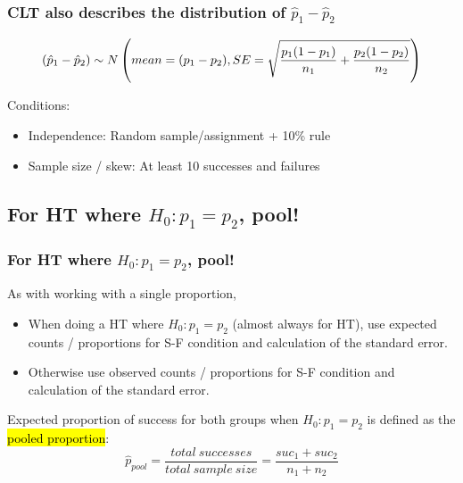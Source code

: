 \documentclass[slidestop,compress,mathserif,12pt,t,professionalfonts,xcolor=table]{beamer}
\begin{document}

\begin{frame}
\frametitle{CLT also describes the distribution of $\hat{p}_1 - \hat{p}_2$}

\[ (\hat{p}_1 - \hat{p}_2) \sim N \left(  mean = (p_1 - p_2), SE = \sqrt{ \frac{p_1(1-p_1)}{n_1} + \frac{p_2(1-p_2)}{n_2} }  \right) \]

Conditions:
\begin{itemize}
\item Independence: Random sample/assignment + 10\% rule
\item Sample size / skew: At least 10 successes and failures
\end{itemize}

\end{frame}


\subsection{For HT where $H_0: p_1 = p_2$, pool!}
\label{mi2}


\begin{frame}
\frametitle{For HT where $H_0: p_1 = p_2$, pool!}

As with working with a single proportion,

\begin{itemize}

\item When doing a HT where $H_0: p_1 = p_2$ (almost always for HT), use expected counts / proportions for S-F condition and calculation of the standard error.

\item Otherwise use observed counts / proportions for S-F condition and calculation of the standard error.

\end{itemize}

\pause 

Expected proportion of success for both groups when $H_0: p_1 = p_2$ is defined as the \hl{pooled proportion}:
\[ \hat{p}_{pool} = \frac{total~successes}{total~sample~size} = \frac{suc_1 + suc_2}{n_1 + n_2} \]

\end{frame}

\end{document}
